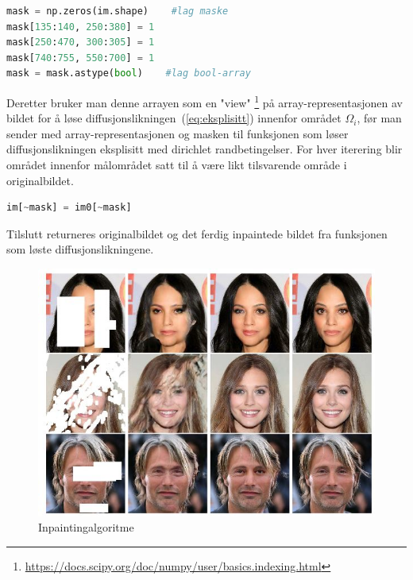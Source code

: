 \begin{lstlisting}[language=Python]
mask = np.zeros(im.shape)    #lag maske
mask[135:140, 250:380] = 1
mask[250:470, 300:305] = 1
mask[740:755, 550:700] = 1
mask = mask.astype(bool)    #lag bool-array
\end{lstlisting}
 
Deretter bruker man denne arrayen som en "view" \footnote{\url{https://docs.scipy.org/doc/numpy/user/basics.indexing.html}} på array-representasjonen av bildet for å løse diffusjonslikningen~(\ref{eq:eksplisitt}) innenfor området $\Omega_i$, før man sender med array-representasjonen og masken til funksjonen som løser diffusjonslikningen eksplisitt med dirichlet randbetingelser. For hver iterering blir området innenfor målområdet satt til å være likt tilsvarende område i originalbildet.
\begin{lstlisting}[language=Python]
    im[~mask] = im0[~mask]
\end{lstlisting}
Tilslutt returneres originalbildet og det ferdig inpaintede bildet fra funksjonen som løste diffusjonslikningene.
\begin{figure}
\begin{center}
    \includegraphics[width=0.6\columnwidth]{bilder/nvidia-image-inpainting-demo.jpg}
    \caption{Inpaintingalgoritme~ \label{Figur 1}}
\end{center}
\end{figure}
